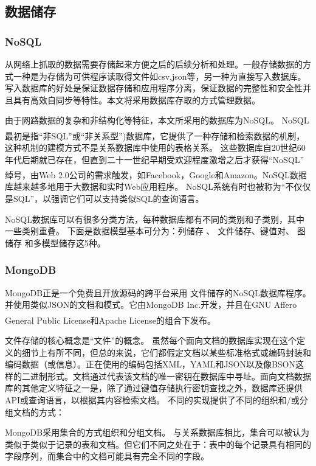 \documentclass[cs4size,a4paper]{ctexart}
\numberwithin{equation}{section}
\numberwithin{table}{section}
\numberwithin{figure}{section}
\newcommand{\upcite}[1]{\textsuperscript{\textsuperscript{\cite{#1}}}}%
\begin{document}
\subsection{数据储存}

\subsubsection{NoSQL}

从网络上抓取的数据需要存储起来方便之后的后续分析和处理。一般存储数据的方式一种是为存储为可供程序读取得文件如csv,json等，另一种为直接写入数据库。
写入数据库的好处是保证数据存储和应用程序分离，保证数据的完整性和安全性并且具有高效自同步等特性。本文将采用数据库存取的方式管理数据。

由于网路数据的复杂和非结构化等特征，本文所采用的数据库为NoSQL。 NoSQL最初是指“非SQL”或“非关系型”)\upcite{Nosql}数据库，它提供了一种存储和检索数据的机制，这种机制的建模方式不是关系数据库中使用的表格关系。 这些数据库自20世纪60年代后期就已存在，但直到二十一世纪早期受欢迎程度激增之后才获得“NoSQL” 绰号，由Web 2.0公司的需求触发，如Facebook，Google和Amazon\upcite{AamzonNosql}。NoSQL数据库越来越多地用于大数据和实时Web应用程序。 NoSQL系统有时也被称为“不仅仅是SQL”，以强调它们可以支持类似SQL的查询语言。

NoSQL数据库可以有很多分类方法，每种数据库都有不同的类别和子类别，其中一些类别重叠。 下面是数据模型基本可分为：列储存 、 文件储存、键值对、 图储存 和多模型储存这5种。

\subsubsection{MongoDB}

MongoDB正是一个免费且开放源码的跨平台采用 文件储存的NoSQL数据库程序。
并使用类似JSON的文档和模式。它由MongoDB Inc.开发，并且在GNU Affero General Public License和Apache License的组合下发布。\upcite{MongoDb}

文件存储的核心概念是“文件”的概念。
虽然每个面向文档的数据库实现在这个定义的细节上有所不同，但总的来说，它们都假定文档以某些标准格式或编码封装和编码数据（或信息）。正在使用的编码包括XML，YAML和JSON以及像BSON这样的二进制形式。文档通过代表该文档的唯一密钥在数据库中寻址。面向文档数据库的其他定义特征之一是，除了通过键值存储执行密钥查找之外，数据库还提供API或查询语言，以根据其内容检索文档。
不同的实现提供了不同的组织和/或分组文档的方式：

MongoDB采用集合的方式组织和分组文档。 与关系数据库相比，集合可以被认为类似于类似于记录的表和文档。但它们不同之处在于：表中的每个记录具有相同的字段序列，而集合中的文档可能具有完全不同的字段。
\end{document}
